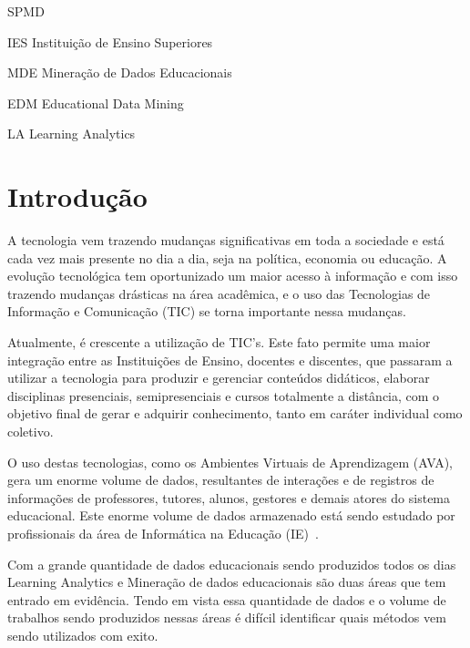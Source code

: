 \documentclass[ti]{texufpel} %
\begin{document}
\begin{listofabbrv}{SPMD}
        \item[IES] Instituição de Ensino Superiores
        \item[MDE] Mineração de Dados Educacionais
        \item[EDM] Educational Data Mining
        \item[LA] Learning Analytics
\end{listofabbrv}

\tableofcontents

\chapter{Introdução}

A tecnologia vem trazendo mudanças significativas em toda a sociedade e está cada vez mais presente no dia a dia, seja na política, economia ou educação. A evolução tecnológica tem oportunizado um maior acesso à informação e com isso trazendo mudanças drásticas na área acadêmica, e o uso das Tecnologias de Informação e Comunicação (TIC) se torna importante nessa mudanças.

Atualmente, é crescente a utilização de TIC's. Este fato permite uma maior integração entre as Instituições de Ensino, docentes e discentes, que passaram a utilizar a tecnologia para produzir e gerenciar conteúdos didáticos, elaborar disciplinas presenciais, semipresenciais e cursos totalmente a distância, com o objetivo final de gerar e adquirir conhecimento, tanto em caráter individual como coletivo.

O uso destas tecnologias, como os Ambientes Virtuais de Aprendizagem (AVA), gera um enorme volume de dados, resultantes de interações e de registros de informações de professores, tutores, alunos, gestores e demais atores do sistema educacional. Este enorme volume de dados armazenado está sendo estudado por profissionais da área de Informática na Educação (IE)~\cite{santos2016analise}.

Com a grande quantidade de dados educacionais sendo produzidos todos os dias Learning Analytics e Mineração de dados educacionais são duas áreas que tem entrado em evidência. Tendo em vista essa quantidade de dados e o volume de trabalhos sendo produzidos nessas áreas é difícil identificar quais métodos vem sendo utilizados com exito.
\end{document}
